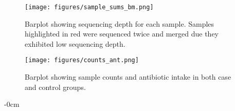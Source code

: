 \documentclass[biotech,article,submit,pdftex,moreauthors]{Definitions/mdpi}
\begin{document}
\begin{figure}[H]
	\centering
	\texttt{[image: figures/sample\_sums\_bm.png]}
	\caption{Barplot showing sequencing depth for each sample. Samples highlighted in red were sequenced twice and merged due they exhibited low sequencing depth.}
	\label{sfig:sample_sums}
\end{figure}

\begin{figure}[H]
	\centering
	\texttt{[image: figures/counts\_ant.png]}
	\caption{Barplot showing sample counts and antibiotic intake in both case and control groups.}
	\label{sfig:counts_ant}
\end{figure}

\begin{adjustwidth}{-\extralength}{0cm}



%


\end{adjustwidth}
\end{document}
